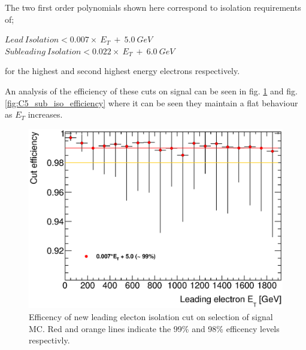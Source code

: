 The two first order polynomials shown here correspond to isolation requirements of;
   \begin{center}
   $Lead~Isolation < 0.007\times~E_{T}~+~5.0~GeV$\\
   $Subleading~Isolation < 0.022\times~E_{T}~+~6.0~GeV$\\
   \end{center}
for the highest and second highest energy electrons respectively. 

An analysis of the efficiency of these cuts on signal can be seen in fig. \ref{fig:C5_lead_iso_efficiency} and fig. \ref{fig:C5_sub_iso_efficiency} where it can be seen they maintain a flat behaviour as $E_{T}$ increases.


   \begin{figure}[h]
      \begin{center}
      \includegraphics[scale=0.6]{images/C5_lead_iso_efficiency.eps}
      \end{center}
   \caption{Efficency of new leading electon isolation cut on selection of signal MC. Red and orange lines indicate the 99\% and 98\% efficency levels respectivly.}
   \label{fig:C5_lead_iso_efficiency}
   \end{figure}


